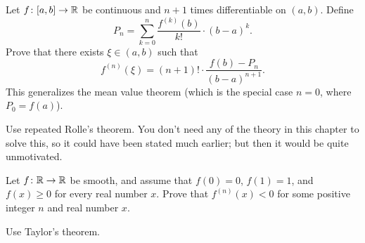 \begin{dproblem}
	Let $f \colon [a,b] \to \mathbb R$ be continuous
	and $n+1$ times differentiable on $(a,b)$.
	Define
	\[ P_n = \sum_{k=0}^n \frac{f^{(k)}(b)}{k!} \cdot (b-a)^k. \]
	Prove that there exists $\xi \in (a,b)$ such that
	\[ f^{(n)}(\xi) = (n+1)! \cdot \frac{f(b) - P_n}{(b-a)^{n+1}}. \]
	This generalizes the mean value theorem
	(which is the special case $n = 0$, where $P_0 = f(a)$).
	\begin{hint}
		Use repeated Rolle's theorem.
		You don't need any of the theory in this chapter to solve this,
		so it could have been stated much earlier;
		but then it would be quite unmotivated.
	\end{hint}
\end{dproblem}

\begin{problem}
	[Putnam 2018 A5]
	\yod
	Let $f \colon \mathbb R \to \mathbb R$ be smooth,
	and assume that $f(0) = 0$, $f(1) = 1$, and $f(x) \ge 0$
	for every real number $x$.
	Prove that $f^{(n)}(x) < 0$ for some positive integer $n$
	and real number $x$.
	\begin{hint}
		Use Taylor's theorem.
	\end{hint}
\end{problem}
